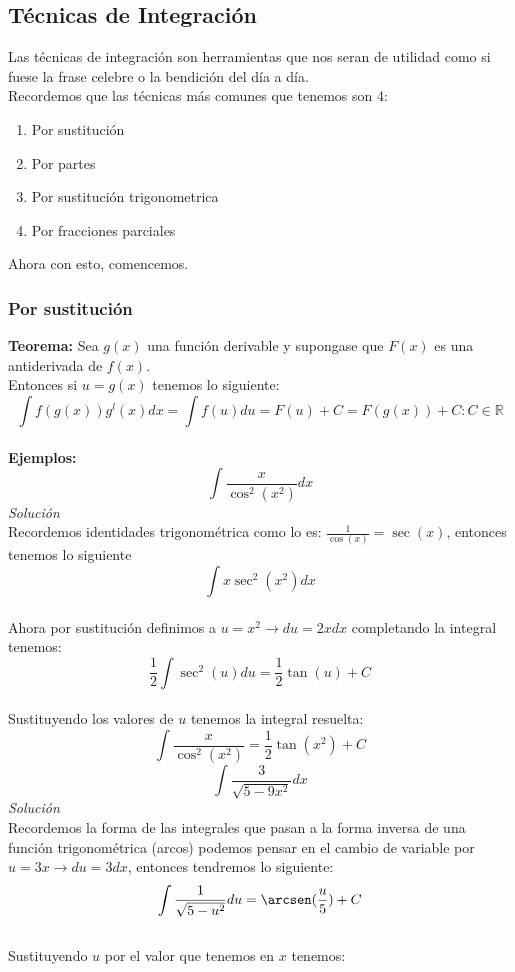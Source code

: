 \documentclass[10pt,executivepaper]{article}
\begin{document}
\subsection{Técnicas de Integración}
Las técnicas de integración son herramientas que nos seran de utilidad como si fuese la frase celebre o la bendición del día a día.\\
Recordemos que las técnicas más comunes que tenemos son 4:
\begin{enumerate}
  \item Por sustitución
  \item Por partes
  \item Por sustitución trigonometrica
  \item Por fracciones parciales
\end{enumerate}
Ahora con esto, comencemos.
\subsubsection{Por sustitución}
\textbf{Teorema:} Sea $g(x)$ una función derivable y supongase que $F(x)$ es una antiderivada de $f(x)$.\\
Entonces si $u=g(x)$ tenemos lo siguiente:\\
\[\int f(g(x))g^{l}(x)dx = \int f(u)du = F(u) + C = F(g(x)) + C   \colon C \in \mathbb{R}\]
\\
\textbf{Ejemplos:}
\\
\[\int \frac{x}{\cos^{2}(x^{2})}dx\]
\textit{Solución}\\
Recordemos identidades trigonométrica como lo es: $\frac{1}{\cos(x)}=\sec(x)$, entonces tenemos lo siguiente
\[\int x \sec^{2}(x^2)dx\]\\
Ahora por sustitución definimos a $u=x^{2} \rightarrow du=2x dx$ completando la integral tenemos:
\[\frac{1}{2}\int \sec^{2}(u)du = \frac{1}{2}\tan(u) + C\]\\
Sustituyendo los valores de $u$ tenemos la integral resuelta:
\[\int \frac{x}{\cos^{2}(x^{2})} = \frac{1}{2} \tan(x^{2}) + C \]
\vspace{1.5cm}
\[\int \frac{3}{\sqrt{5-9x^{2}}}dx\]
\textit{Solución}\\
Recordemos la forma de las integrales que pasan a la forma inversa de una función trigonométrica (arcos) podemos pensar en el cambio de variable por $u=3x \rightarrow du=3dx$, entonces tendremos lo siguiente:\\
\[\int \frac{1}{\sqrt{5-u^{2}}}du = \arcsen(\frac{u}{5}) + C\]\\
Sustituyendo $u$ por el valor que tenemos en $x$ tenemos:\\
\end{document}
